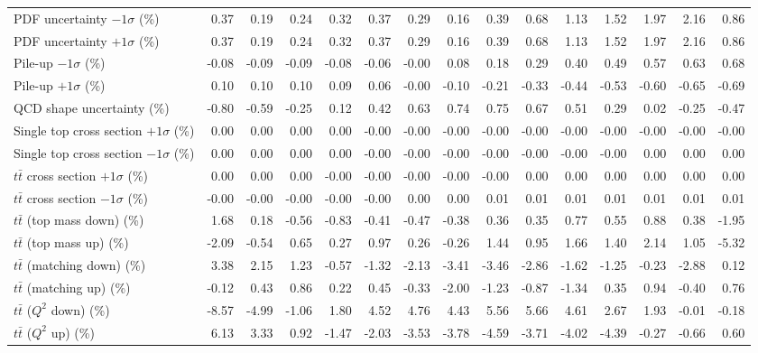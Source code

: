 \begin{table}[htbp]
{\begin{tabular}{lrrrrrrrrrrrrrr}
PDF uncertainty $-1\sigma$ (\%) & 0.37 & 0.19 & 0.24 & 0.32 & 0.37 & 0.29 & 0.16 & 0.39 & 0.68 & 1.13 & 1.52 & 1.97 & 2.16 & 0.86 \\ 
PDF uncertainty $+1\sigma$ (\%) & 0.37 & 0.19 & 0.24 & 0.32 & 0.37 & 0.29 & 0.16 & 0.39 & 0.68 & 1.13 & 1.52 & 1.97 & 2.16 & 0.86 \\ 
Pile-up $-1\sigma$ (\%) & -0.08 & -0.09 & -0.09 & -0.08 & -0.06 & -0.00 & 0.08 & 0.18 & 0.29 & 0.40 & 0.49 & 0.57 & 0.63 & 0.68 \\ 
Pile-up $+1\sigma$ (\%) & 0.10 & 0.10 & 0.10 & 0.09 & 0.06 & -0.00 & -0.10 & -0.21 & -0.33 & -0.44 & -0.53 & -0.60 & -0.65 & -0.69 \\ 
QCD shape uncertainty (\%) & -0.80 & -0.59 & -0.25 & 0.12 & 0.42 & 0.63 & 0.74 & 0.75 & 0.67 & 0.51 & 0.29 & 0.02 & -0.25 & -0.47 \\ 
Single top cross section $+1\sigma$ (\%) & 0.00 & 0.00 & 0.00 & 0.00 & -0.00 & -0.00 & -0.00 & -0.00 & -0.00 & -0.00 & -0.00 & -0.00 & -0.00 & -0.00 \\ 
Single top cross section $-1\sigma$ (\%) & 0.00 & 0.00 & 0.00 & 0.00 & -0.00 & -0.00 & -0.00 & -0.00 & -0.00 & -0.00 & -0.00 & 0.00 & 0.00 & 0.00 \\ 
$t\bar{t}$ cross section $+1\sigma$ (\%) & 0.00 & 0.00 & 0.00 & -0.00 & -0.00 & -0.00 & -0.00 & -0.00 & 0.00 & 0.00 & 0.00 & 0.00 & 0.00 & 0.00 \\ 
$t\bar{t}$ cross section $-1\sigma$ (\%) & -0.00 & -0.00 & -0.00 & -0.00 & -0.00 & 0.00 & 0.00 & 0.01 & 0.01 & 0.01 & 0.01 & 0.01 & 0.01 & 0.01 \\ 
$t\bar{t}$ (top mass down) (\%) & 1.68 & 0.18 & -0.56 & -0.83 & -0.41 & -0.47 & -0.38 & 0.36 & 0.35 & 0.77 & 0.55 & 0.88 & 0.38 & -1.95 \\ 
$t\bar{t}$ (top mass up) (\%) & -2.09 & -0.54 & 0.65 & 0.27 & 0.97 & 0.26 & -0.26 & 1.44 & 0.95 & 1.66 & 1.40 & 2.14 & 1.05 & -5.32 \\ 
$t\bar{t}$ (matching down) (\%) & 3.38 & 2.15 & 1.23 & -0.57 & -1.32 & -2.13 & -3.41 & -3.46 & -2.86 & -1.62 & -1.25 & -0.23 & -2.88 & 0.12 \\ 
$t\bar{t}$ (matching up) (\%) & -0.12 & 0.43 & 0.86 & 0.22 & 0.45 & -0.33 & -2.00 & -1.23 & -0.87 & -1.34 & 0.35 & 0.94 & -0.40 & 0.76 \\ 
$t\bar{t}$ ($Q^{2}$ down) (\%) & -8.57 & -4.99 & -1.06 & 1.80 & 4.52 & 4.76 & 4.43 & 5.56 & 5.66 & 4.61 & 2.67 & 1.93 & -0.01 & -0.18 \\ 
$t\bar{t}$ ($Q^{2}$ up) (\%) & 6.13 & 3.33 & 0.92 & -1.47 & -2.03 & -3.53 & -3.78 & -4.59 & -3.71 & -4.02 & -4.39 & -0.27 & -0.66 & 0.60 \\ 

\end{tabular}}
\end{table}
